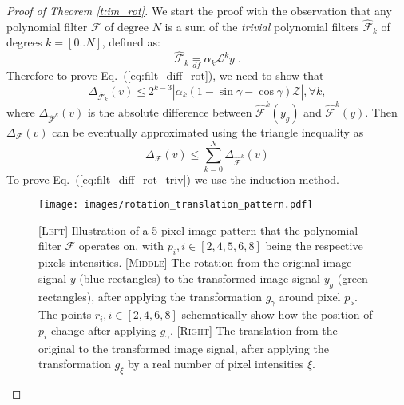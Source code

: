 \documentclass[10pt,journal,compsoc]{IEEEtran}
\newcommand{\df}{\mathop{=}\limits_{df}}
\newcommand{\mF}{\mathcal{F}}
\newcommand{\hmF}{\hat{\mathcal{F}}}
\newcommand{\norm}[1]{\left|#1\right|}
\begin{document}
	\begin{proof}[Proof of Theorem \ref{t:im_rot}]
		
		
		
		We start the proof with the observation that any polynomial filter $\mathcal{F}$ of degree $N$ is a sum of the \emph{trivial} polynomial filters $\hmF_k$ of degrees $k = [0..N]$, defined as:
			\begin{equation}
			\hmF_k \df \alpha_k \mathcal{L}^k y \;.
			\end{equation}
			\noindent
			Therefore to prove Eq.~(\ref{eq:filt_diff_rot}), we need to show that
		\begin{equation}
		\Delta_{\hmF_k} (v) \leq 2^{k-3} \norm{\alpha_k(1 - \sin\gamma - \cos\gamma) \bar{\mathcal{Z}}}, \forall k, 
		\label{eq:filt_diff_rot_triv}
		\end{equation}
		\noindent
		where $\Delta_{\hmF^k} (v)$ is the absolute difference between $\hmF^k(y_g)$ and $\hmF^k(y)$. Then $\Delta_{\mF} (v)$ can be eventually approximated using the triangle inequality as 
		\begin{equation}
		\Delta_\mF (v) \leq \sum_{k=0}^{N} \Delta_{\hmF^k} (v)
		\label{eq:filt_diff_rot_sum}
		\end{equation}
		To prove Eq.~(\ref{eq:filt_diff_rot_triv}) we use the induction method.
		\begin{figure}
			\centering
			\texttt{[image: images/rotation\_translation\_pattern.pdf]} 
			\caption{[\textsc{Left}] Illustration of a 5-pixel image pattern that the polynomial filter $\mathcal{F}$ operates on, with $p_i, i \in [2,4,5,6,8]$ being the respective pixels intensities. [\textsc{Middle}] The rotation from the original image signal $y$ (blue rectangles) to the transformed image signal $y_g$ (green rectangles), after applying the transformation $g_\gamma$ around pixel $p_5$. The points $r_i, i \in [2,4,6,8]$ schematically show how the position of $p_i$ change after applying $g_\gamma$. [\textsc{Right}] The translation from the original to the transformed image signal, after applying the transformation $g_\xi$ by a real number of pixel intensities $\xi$.}
			\label{fig:pattern}
		\end{figure} 
		

\end{proof}
\end{document}
